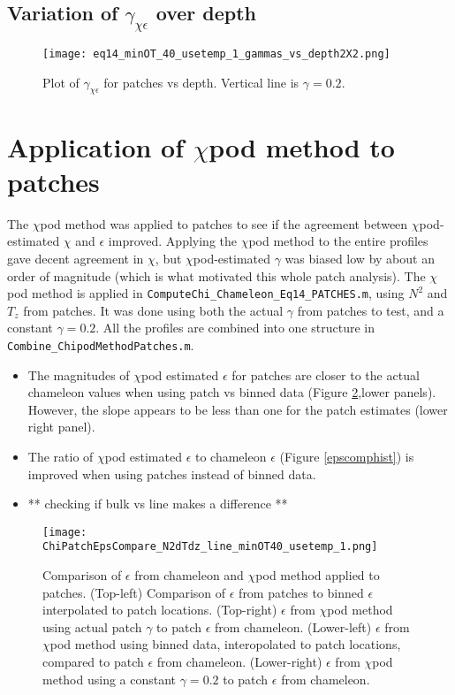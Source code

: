 \documentclass[11pt]{article}
\begin{document}
\clearpage
\subsection{Variation of $\gamma_{\chi\epsilon}$ over depth}

\begin{figure}[htbp]
\texttt{[image: eq14\_minOT\_40\_usetemp\_1\_gammas\_vs\_depth2X2.png]}
\caption{Plot of $\gamma_{\chi\epsilon}$ for patches vs depth. Vertical line is $\gamma=0.2$. }
\label{gamvsdepth}
\end{figure}





\clearpage
\section{Application of $\chi$pod method to patches}

The $\chi$pod method was applied to patches to see if the agreement between $\chi$pod-estimated $\chi$ and $\epsilon$ improved. Applying the $\chi$pod method to the entire profiles gave decent agreement in $\chi$, but $\chi$pod-estimated $\gamma$ was biased low by about an order of magnitude (which is what motivated this whole patch analysis).  The $\chi$pod method is applied in \verb+ComputeChi_Chameleon_Eq14_PATCHES.m+, using $N^2$ and $T_z$ from patches. It was done using both the actual $\gamma$ from patches to test, and a constant $\gamma=0.2$. All the profiles are combined into one structure in \verb+Combine_ChipodMethodPatches.m+.

\begin{itemize}
\item The magnitudes of $\chi$pod estimated $\epsilon$ for patches are closer to the actual chameleon values when using patch vs binned data (Figure \ref{epscomp2d},lower panels). However, the slope appears to be less than one for the patch estimates (lower right panel).
\item The ratio of $\chi$pod estimated $\epsilon$ to chameleon $\epsilon$ (Figure \ref{epscomphist}) is improved when using patches instead of binned data. 
\item ** checking if bulk vs line makes a difference **
\end{itemize}


\begin{figure}[htbp]
\texttt{[image: ChiPatchEpsCompare\_N2dTdz\_line\_minOT40\_usetemp\_1.png]}
\caption{Comparison of $\epsilon$ from chameleon and $\chi$pod method applied to patches. (Top-left) Comparison of $\epsilon$ from patches to binned $\epsilon$ interpolated to patch locations. (Top-right) $\epsilon$ from $\chi$pod method using actual patch $\gamma$ to patch $\epsilon$ from chameleon. (Lower-left) $\epsilon$ from $\chi$pod method using binned data, interopolated to patch locations, compared to patch $\epsilon$ from chameleon. (Lower-right) $\epsilon$ from $\chi$pod method using a constant $\gamma=0.2$ to patch $\epsilon$ from chameleon.}
\label{epscomp2d}
\end{figure}
\end{document}
